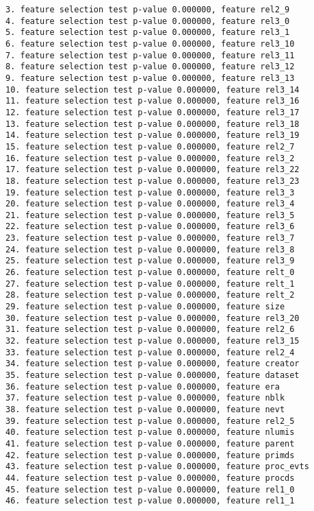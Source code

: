 \begin{verbatim}
3. feature selection test p-value 0.000000, feature rel2_9
4. feature selection test p-value 0.000000, feature rel3_0
5. feature selection test p-value 0.000000, feature rel3_1
6. feature selection test p-value 0.000000, feature rel3_10
7. feature selection test p-value 0.000000, feature rel3_11
8. feature selection test p-value 0.000000, feature rel3_12
9. feature selection test p-value 0.000000, feature rel3_13
10. feature selection test p-value 0.000000, feature rel3_14
11. feature selection test p-value 0.000000, feature rel3_16
12. feature selection test p-value 0.000000, feature rel3_17
13. feature selection test p-value 0.000000, feature rel3_18
14. feature selection test p-value 0.000000, feature rel3_19
15. feature selection test p-value 0.000000, feature rel2_7
16. feature selection test p-value 0.000000, feature rel3_2
17. feature selection test p-value 0.000000, feature rel3_22
18. feature selection test p-value 0.000000, feature rel3_23
19. feature selection test p-value 0.000000, feature rel3_3
20. feature selection test p-value 0.000000, feature rel3_4
21. feature selection test p-value 0.000000, feature rel3_5
22. feature selection test p-value 0.000000, feature rel3_6
23. feature selection test p-value 0.000000, feature rel3_7
24. feature selection test p-value 0.000000, feature rel3_8
25. feature selection test p-value 0.000000, feature rel3_9
26. feature selection test p-value 0.000000, feature relt_0
27. feature selection test p-value 0.000000, feature relt_1
28. feature selection test p-value 0.000000, feature relt_2
29. feature selection test p-value 0.000000, feature size
30. feature selection test p-value 0.000000, feature rel3_20
31. feature selection test p-value 0.000000, feature rel2_6
32. feature selection test p-value 0.000000, feature rel3_15
33. feature selection test p-value 0.000000, feature rel2_4
34. feature selection test p-value 0.000000, feature creator
35. feature selection test p-value 0.000000, feature dataset
36. feature selection test p-value 0.000000, feature era
37. feature selection test p-value 0.000000, feature nblk
38. feature selection test p-value 0.000000, feature nevt
39. feature selection test p-value 0.000000, feature rel2_5
40. feature selection test p-value 0.000000, feature nlumis
41. feature selection test p-value 0.000000, feature parent
42. feature selection test p-value 0.000000, feature primds
43. feature selection test p-value 0.000000, feature proc_evts
44. feature selection test p-value 0.000000, feature procds
45. feature selection test p-value 0.000000, feature rel1_0
46. feature selection test p-value 0.000000, feature rel1_1

\end{verbatim}
